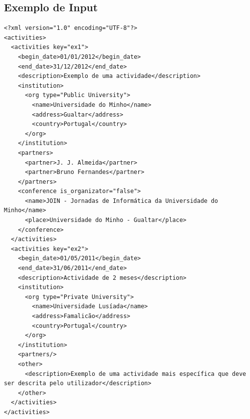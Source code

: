 \documentclass[a4paper,11pt,openright,openbib]{article}
\begin{document}
\subsection{Exemplo de Input}
\begin{verbatim}
<?xml version="1.0" encoding="UTF-8"?>
<activities>
  <activities key="ex1">
    <begin_date>01/01/2012</begin_date>
    <end_date>31/12/2012</end_date>
    <description>Exemplo de uma actividade</description>
    <institution>
      <org type="Public University">
        <name>Universidade do Minho</name>
        <address>Gualtar</address>
        <country>Portugal</country>
      </org>
    </institution>
    <partners>
      <partner>J. J. Almeida</partner>
      <partner>Bruno Fernandes</partner>
    </partners>
    <conference is_organizator="false">
      <name>JOIN - Jornadas de Informática da Universidade do Minho</name>
      <place>Universidade do Minho - Gualtar</place>
    </conference>
  </activities>
  <activities key="ex2">
    <begin_date>01/05/2011</begin_date>
    <end_date>31/06/2011</end_date>
    <description>Actividade de 2 meses</description>
    <institution>
      <org type="Private University">
        <name>Universidade Lusíada</name>
        <address>Famalicão</address>
        <country>Portugal</country>
      </org>
    </institution>
    <partners/>
    <other>
      <description>Exemplo de uma actividade mais específica que deve ser descrita pelo utilizador</description>
    </other>
  </activities>
</activities>
\end{verbatim}
\end{document}
